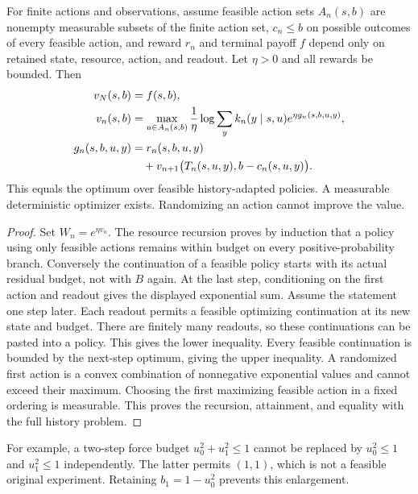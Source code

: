 \begin{theorem}\label{thm:budget-dpp}
For finite actions and observations, assume feasible action sets $A_n(s,b)$ are nonempty measurable subsets of the finite action set, $c_n\le b$ on possible outcomes of every feasible action, and reward $r_n$ and terminal payoff $f$ depend only on retained state, resource, action, and readout. Let $\eta>0$ and all rewards be bounded. Then
\begin{align}
 v_N(s,b)&=f(s,b),\\
 v_n(s,b)&=\max_{u\in A_n(s,b)}\frac1\eta\log
 \sum_y k_n(y\mid s,u)e^{\eta g_n(s,b,u,y)},
 \label{eq:resource-dpp}\\
 g_n(s,b,u,y)&=r_n(s,b,u,y)\notag\\
 &\quad+v_{n+1}\bigl(T_n(s,u,y),b-c_n(s,u,y)\bigr).\notag
\end{align}
This equals the optimum over feasible history-adapted policies. A measurable deterministic optimizer exists. Randomizing an action cannot improve the value.
\end{theorem}
\begin{proof}
Set $W_n=e^{\eta v_n}$. The resource recursion proves by induction that a policy using only feasible actions remains within budget on every positive-probability branch. Conversely the continuation of a feasible policy starts with its actual residual budget, not with $B$ again. At the last step, conditioning on the first action and readout gives the displayed exponential sum. Assume the statement one step later. Each readout permits a feasible optimizing continuation at its new state and budget. There are finitely many readouts, so these continuations can be pasted into a policy. This gives the lower inequality. Every feasible continuation is bounded by the next-step optimum, giving the upper inequality. A randomized first action is a convex combination of nonnegative exponential values and cannot exceed their maximum. Choosing the first maximizing feasible action in a fixed ordering is measurable. This proves the recursion, attainment, and equality with the full history problem.
\end{proof}

For example, a two-step force budget $u_0^2+u_1^2\le1$ cannot be replaced by $u_0^2\le1$ and $u_1^2\le1$ independently. The latter permits $(1,1)$, which is not a feasible original experiment. Retaining $b_1=1-u_0^2$ prevents this enlargement.


